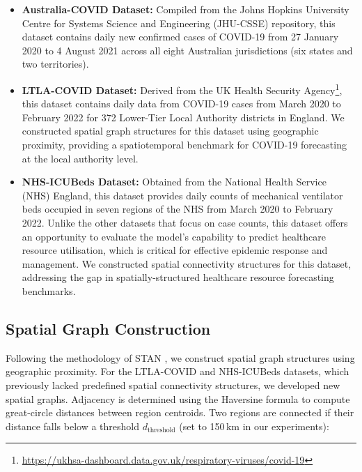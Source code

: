 \documentclass[a4paper,fleqn]{cas-dc}
\begin{document}
\begin{itemize}
    \item \textbf{Australia-COVID Dataset:} Compiled from the Johns Hopkins University Centre for Systems Science and Engineering (JHU-CSSE) repository, this dataset contains daily new confirmed cases of COVID-19 from 27 January 2020 to 4 August 2021 across all eight Australian jurisdictions (six states and two territories).

    \item \textbf{LTLA-COVID Dataset:} Derived from the UK Health Security Agency\footnote{\url{https://ukhsa-dashboard.data.gov.uk/respiratory-viruses/covid-19}}, this dataset contains daily data from COVID-19 cases from March 2020 to February 2022 for 372 Lower-Tier Local Authority districts in England. We constructed spatial graph structures for this dataset using geographic proximity, providing a spatiotemporal benchmark for COVID-19 forecasting at the local authority level.
    
    \item \textbf{NHS-ICUBeds Dataset:} Obtained from the National Health Service (NHS) England\cite{NHS2024HospitalActivity}, this dataset provides daily counts of mechanical ventilator beds occupied in seven regions of the NHS from March 2020 to February 2022. Unlike the other datasets that focus on case counts, this dataset offers an opportunity to evaluate the model's capability to predict healthcare resource utilisation, which is critical for effective epidemic response and management. We constructed spatial connectivity structures for this dataset, addressing the gap in spatially-structured healthcare resource forecasting benchmarks.
\end{itemize}

\subsection{Spatial Graph Construction}
\label{sec:graph_construction} 

Following the methodology of STAN \cite{gao2021stan}, we construct spatial graph structures using geographic proximity. For the LTLA-COVID and NHS-ICUBeds datasets, which previously lacked predefined spatial connectivity structures, we developed new spatial graphs. Adjacency is determined using the Haversine formula to compute great-circle distances between region centroids. Two regions are connected if their distance falls below a threshold $d_{\text{threshold}}$ (set to 150\,km in our experiments):
\end{document}
